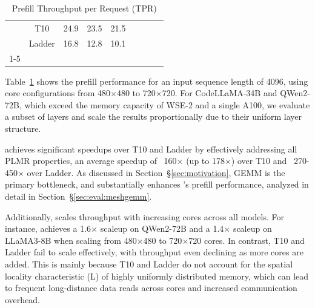 \begin{table}[t]
{\begin{tabular}{c|c|ccclccc}
 & T10 & \multicolumn{1}{c|}{24.9} & \multicolumn{1}{c|}{23.5} & 21.5 &  & \multicolumn{1}{c|}{} & \multicolumn{1}{c|}{} &  \\
 & Ladder & \multicolumn{1}{c|}{16.8} & \multicolumn{1}{c|}{12.8} & 10.1 &  & \multicolumn{1}{c|}{} & \multicolumn{1}{c|}{} &  \\ \cline{1-5} \cline{7-9} 
\end{tabular}%
}
  \caption{Prefill Throughput per Request (TPR)}
  \vspace{-0.2cm}
\label{tab:prefill_throughput}
\end{table}%

 Table~\ref{tab:prefill_throughput} shows the prefill performance for an input sequence length of 4096, using core configurations from 480$\times$480 to 720$\times$720. For CodeLLaMA-34B and QWen2-72B, which exceed the memory capacity of WSE-2 and a single A100, we evaluate a subset of layers and scale the results proportionally due to their uniform layer structure.

\sys achieves significant speedups over T10 and Ladder by effectively addressing all PLMR properties, an average speedup of ~160$\times$ (up to 178$\times$) over T10 and ~270-450$\times$ over Ladder. As discussed in Section~\S\ref{sec:motivation}, GEMM is the primary bottleneck, and \gemm substantially enhances \sys's prefill performance, analyzed in detail in Section~\S\ref{sec:eval:meshgemm}.

Additionally, \sys scales throughput with increasing cores across all models. For instance, \sys achieves a 1.6$\times$ scaleup on QWen2-72B and a 1.4$\times$ scaleup on LLaMA3-8B when scaling from 480$\times$480 to 720$\times$720 cores. In contrast, T10 and Ladder fail to scale effectively, with throughput even declining as more cores are added. This is mainly because T10 and Ladder do not account for the spatial locality characteristic (L) of highly uniformly distributed memory, which can lead to frequent long-distance data reads across cores and increased communication overhead.

